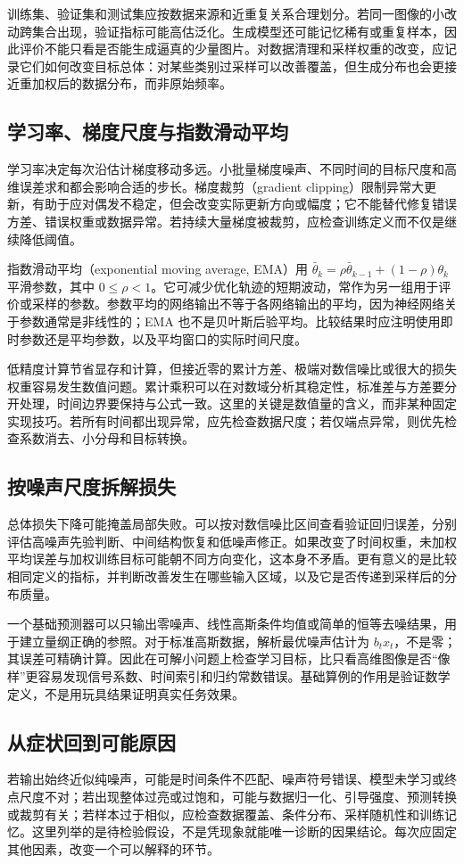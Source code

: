 \documentclass[UTF8,12pt,a4paper,fontset=fandol]{ctexart}
\begin{document}
训练集、验证集和测试集应按数据来源和近重复关系合理划分。若同一图像的小改动跨集合出现，验证指标可能高估泛化。生成模型还可能记忆稀有或重复样本，因此评价不能只看是否能生成逼真的少量图片。对数据清理和采样权重的改变，应记录它们如何改变目标总体：对某些类别过采样可以改善覆盖，但生成分布也会更接近重加权后的数据分布，而非原始频率。

\subsection{学习率、梯度尺度与指数滑动平均}
学习率决定每次沿估计梯度移动多远。小批量梯度噪声、不同时间的目标尺度和高维误差求和都会影响合适的步长。梯度裁剪（gradient clipping）限制异常大更新，有助于应对偶发不稳定，但会改变实际更新方向或幅度；它不能替代修复错误方差、错误权重或数据异常。若持续大量梯度被裁剪，应检查训练定义而不仅是继续降低阈值。

指数滑动平均（exponential moving average, EMA）用 $\bar\theta_k=\rho\bar\theta_{k-1}+(1-\rho)\theta_k$ 平滑参数，其中 $0\leq\rho<1$。它可减少优化轨迹的短期波动，常作为另一组用于评价或采样的参数。参数平均的网络输出不等于各网络输出的平均，因为神经网络关于参数通常是非线性的；EMA 也不是贝叶斯后验平均。比较结果时应注明使用即时参数还是平均参数，以及平均窗口的实际时间尺度。

低精度计算节省显存和计算，但接近零的累计方差、极端对数信噪比或很大的损失权重容易发生数值问题。累计乘积可以在对数域分析其稳定性，标准差与方差要分开处理，时间边界要保持与公式一致。这里的关键是数值量的含义，而非某种固定实现技巧。若所有时间都出现异常，应先检查数据尺度；若仅端点异常，则优先检查系数消去、小分母和目标转换。

\subsection{按噪声尺度拆解损失}
总体损失下降可能掩盖局部失败。可以按对数信噪比区间查看验证回归误差，分别评估高噪声先验判断、中间结构恢复和低噪声修正。如果改变了时间权重，未加权平均误差与加权训练目标可能朝不同方向变化，这本身不矛盾。更有意义的是比较相同定义的指标，并判断改善发生在哪些输入区域，以及它是否传递到采样后的分布质量。

一个基础预测器可以只输出零噪声、线性高斯条件均值或简单的恒等去噪结果，用于建立量纲正确的参照。对于标准高斯数据，解析最优噪声估计为 $b_tx_t$，不是零；其误差可精确计算。因此在可解小问题上检查学习目标，比只看高维图像是否“像样”更容易发现信号系数、时间索引和归约常数错误。基础算例的作用是验证数学定义，不是用玩具结果证明真实任务效果。

\subsection{从症状回到可能原因}
若输出始终近似纯噪声，可能是时间条件不匹配、噪声符号错误、模型未学习或终点尺度不对；若出现整体过亮或过饱和，可能与数据归一化、引导强度、预测转换或裁剪有关；若样本过于相似，应检查数据覆盖、条件分布、采样随机性和训练记忆。这里列举的是待检验假设，不是凭现象就能唯一诊断的因果结论。每次应固定其他因素，改变一个可以解释的环节。
\end{document}
